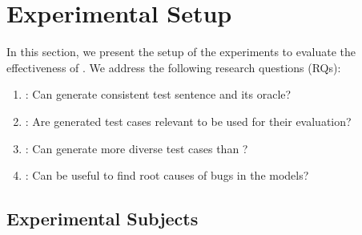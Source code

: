 \section{Experimental Setup}
\label{sec:experiment}
%
In this section, we present the setup of the experiments to evaluate
the effectiveness of \tool{}. We address the following research
questions (RQs):


\begin{enumerate}[label=\textbf{RQ\arabic*}]
\item \label{rq:one}: Can \tool generate consistent test sentence and
  its oracle?
\item \label{rq:two}: Are \tool generated test cases relevant to be used
  for their \lc evaluation?
\item \label{rq:three}: Can \tool generate more diverse test cases
  than \Cklst?
\item \label{rq:four}: Can \tool be useful to find root causes of bugs
  in the \sa models?
\end{enumerate}





\subsection{Experimental Subjects}

